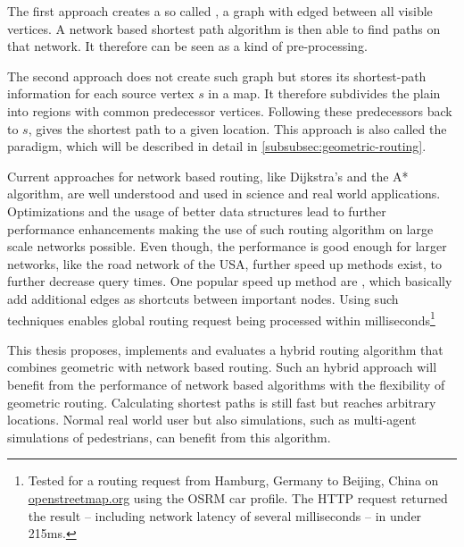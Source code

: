 The first approach creates a so called , a graph with edged between all visible vertices.
A network based shortest path algorithm is then able to find paths on that network\cite[2]{hershberger-suri}.
It therefore can be seen as a kind of pre-processing.

The second approach does not create such graph but stores its shortest-path information for each source vertex $s$ in a map.
It therefore subdivides the plain into regions with common predecessor vertices.
Following these predecessors back to $s$, gives the shortest path to a given location.
This approach is also called the  paradigm, which will be described in detail in \cref{subsubsec:geometric-routing}.

Current approaches for network based routing, like Dijkstra's and the A* algorithm, are well understood and used in science and real world applications.
Optimizations and the usage of better data structures lead to further performance enhancements making the use of such routing algorithm on large scale networks possible.
Even though, the performance is good enough for larger networks, like the road network of the USA\cite[5]{aviram-optimizing-dijkstra}, further speed up methods exist, to further decrease query times.
One popular speed up method are , which basically add additional edges as shortcuts between important nodes\cite{geisberger-contraction-hierarchies}.
Using such techniques enables global routing request being processed within milliseconds\footnote{Tested for a routing request from Hamburg, Germany to Beijing, China on \href{https://www.openstreetmap.org/directions?engine=fossgis\_osrm\_car&route=53.55\%2C10.00\%3B39.91\%2C116.39}{openstreetmap.org} using the OSRM car profile. The HTTP request returned the result -- including network latency of several milliseconds -- in under 215ms.}

This thesis proposes, implements and evaluates a hybrid routing algorithm that combines geometric with network based routing.
Such an hybrid approach will benefit from the performance of network based algorithms with the flexibility of geometric routing.
Calculating shortest paths is still fast but reaches arbitrary locations.
Normal real world user but also simulations, such as multi-agent simulations of pedestrians, can benefit from this algorithm.